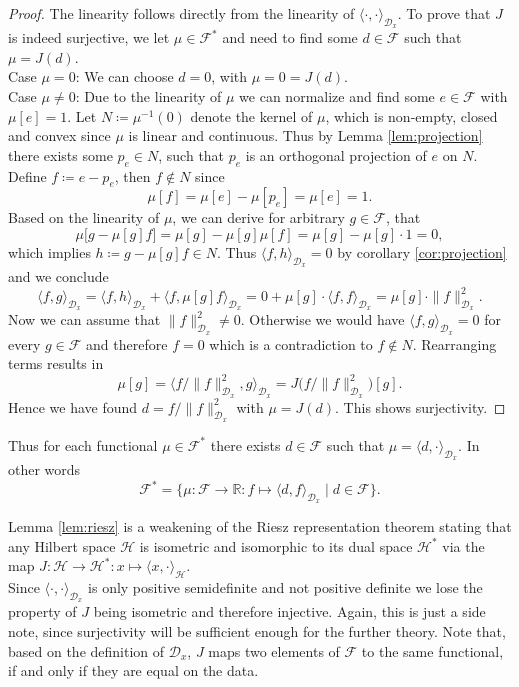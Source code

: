 \documentclass[11pt, a4paper]{article}
\newcommand{\R}{\mathbb{R}}
\newcommand{\D}{\mathcal{D}}
\newcommand{\F}{\mathcal{F}}
\renewcommand{\H}{\mathcal{H}}
\begin{document}
\begin{proof}
The linearity follows directly from the linearity of $\langle \cdot, \cdot \rangle_{\D_x}$. To prove that $J$ is indeed surjective, we let $\mu \in \F^*$ and need to find some $d \in \F$ such that $\mu = J(d)$. \\

Case $\mu=0$: We can choose $d=0$, with $\mu = 0 = J(d)$. \\

Case $\mu \neq 0$: Due to the linearity of $\mu$ we can normalize and find some $e \in \F$ with $\mu[e] = 1$. Let $N \coloneq \mu^{-1}(0)$ denote the kernel of $\mu$, which is non-empty, closed and convex since $\mu$ is linear and continuous. Thus by Lemma \ref{lem:projection} there exists some $p_e \in N$, such that $p_e$ is an orthogonal projection of $e$ on $N$. Define $f \coloneq e - p_e$, then $f \notin N$ since
\[ \mu[f] = \mu[e] - \mu[p_e] = \mu[e] = 1. \]
Based on the linearity of $\mu$, we can derive for arbitrary $g \in \F$, that
\[ \mu \big [g- \mu[g]f \big] = \mu[g] - \mu[g] \mu[f] = \mu[g] - \mu[g] \cdot 1 = 0 , \]
which implies $h \coloneq g - \mu[g]f \in N$. Thus $\langle f , h \rangle_{\D_x} = 0$ by corollary \ref{cor:projection} and we conclude
\[ \langle f, g \rangle_{\D_x} = \langle f , h \rangle_{\D_x} + \langle f , \mu[g]f \rangle_{\D_x} = 0 + \mu[g] \cdot \langle f , f \rangle_{\D_x} = \mu[g] \cdot \| f \|_{\D_x}^2. \]
Now we can assume that $\| f \|_{\D_x}^2 \neq 0$. Otherwise we would have $\langle f, g \rangle_{\D_x} = 0$ for every $g \in \F$ and therefore $f = 0$ which is a contradiction to $f \notin N$. Rearranging terms results in
\[ \mu[g] = \big \langle f / \| f \|_{\D_x}^2 , g \big \rangle_{\D_x} = J \big (f / \| f \|_{\D_x}^2 \big)[g]. \]
Hence we have found $d = f / \| f \|_{\D_x}^2$ with $\mu = J(d)$. This shows surjectivity.
\end{proof}

Thus for each functional $\mu \in \F^*$ there exists $d \in \F$ such that $\mu = \langle d, \cdot \rangle_{\D_x}$. In other words
\[ \F^* = \Big \{ \mu : \F \to \R : f \mapsto \langle d,f \rangle _{\D_x} \mid d \in \F \Big \}. \]

Lemma \ref{lem:riesz} is a weakening of the Riesz representation theorem stating that any Hilbert space $\H$ is isometric and isomorphic to its dual space $\H^*$ via the map $J:\H \to \H^* : x \mapsto \langle x , \cdot \rangle_\H$. \\

Since $\langle \cdot , \cdot \rangle_{\D_x}$ is only positive semidefinite and not positive definite we lose the property of $J$ being isometric and therefore injective. Again, this is just a side note, since surjectivity will be sufficient enough for the further theory. Note that, based on the definition of $\D_x$, $J$ maps two elements of $\F$ to the same functional, if and only if they are equal on the data.  \\
\end{document}
